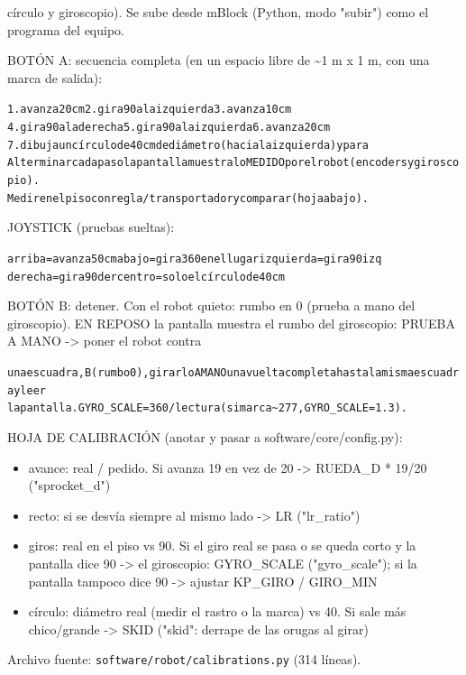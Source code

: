 círculo y giroscopio). Se sube desde mBlock (Python, modo "subir") como el programa del equipo.

BOTÓN A: secuencia completa (en un espacio libre de \textasciitilde{}1 m x 1 m, con una marca de salida):

{\small\begin{alltt}
1. avanza 20 cm            2. gira 90\textdegree{} a la izquierda   3. avanza 10 cm
4. gira 90\textdegree{} a la derecha   5. gira 90\textdegree{} a la izquierda   6. avanza 20 cm
7. dibuja un círculo de 40 cm de diámetro (hacia la izquierda) y para
Al terminar cada paso la pantalla muestra lo MEDIDO por el robot (encoders y giroscopio).
Medir en el piso con regla/transportador y comparar (hoja abajo).
\end{alltt}}
JOYSTICK (pruebas sueltas):

{\small\begin{alltt}
arriba = avanza 50 cm   abajo = gira 360\textdegree{} en el lugar   izquierda = gira 90\textdegree{} izq
derecha = gira 90\textdegree{} der  centro = solo el círculo de 40 cm
\end{alltt}}
BOTÓN B: detener. Con el robot quieto: rumbo en 0 (prueba a mano del giroscopio). EN REPOSO la pantalla muestra el rumbo del giroscopio: PRUEBA A MANO -> poner el robot contra

{\small\begin{alltt}
una escuadra, B (rumbo 0), girarlo A MANO una vuelta completa hasta la misma escuadra y leer
la pantalla. GYRO\_SCALE = 360 / lectura (si marca \textasciitilde{}277, GYRO\_SCALE = 1.3).
\end{alltt}}
HOJA DE CALIBRACIÓN (anotar y pasar a software/core/config.py):

\begin{itemize}\setlength\itemsep{0pt}
\item avance:  real / pedido. Si avanza 19 en vez de 20 -> RUEDA\_D * 19/20  ("sprocket\_d")
\item recto:   si se desvía siempre al mismo lado -> LR ("lr\_ratio")
\item giros:   real en el piso vs 90\textdegree{}. Si el giro real se pasa o se queda corto y la pantalla dice 90 -> el giroscopio: GYRO\_SCALE ("gyro\_scale"); si la pantalla tampoco dice 90 -> ajustar KP\_GIRO / GIRO\_MIN
\item círculo: diámetro real (medir el rastro o la marca) vs 40. Si sale más chico/grande -> SKID ("skid": derrape de las orugas al girar)
\end{itemize}
\noindent Archivo fuente: \texttt{software/robot/calibrations.py} (314 l\'ineas).

